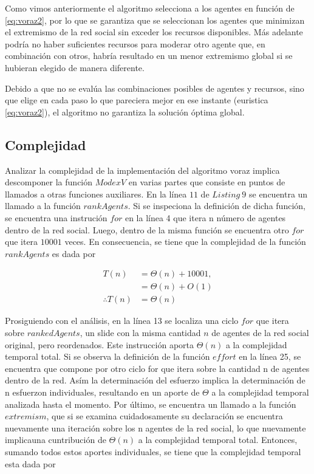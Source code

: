 \documentclass[letterpaper,10pt]{article}
\begin{document}
Como vimos anteriormente el algoritmo selecciona a los agentes en función de \eqref{eq:voraz2}, por lo que se garantiza que se seleccionan los agentes que minimizan el extremismo de la red social sin exceder los recursos disponibles. Más adelante podría no haber suficientes recursos para moderar otro agente que, en combinación con otros, habría resultado en un menor extremismo global si se hubieran elegido de manera diferente.

Debido a que no se evalúa las combinaciones posibles de agentes y recursos, sino que elige en cada paso lo que pareciera mejor en ese instante (euristica \eqref{eq:voraz2}), el algoritmo no garantiza la solución óptima global.

\subsection{Complejidad}
\label{subsec:complejidad_algoritmo_voraz}
Analizar la complejidad de la implementación del algoritmo voraz implica descomponer la función $ModexV$ en varias partes que consiste en puntos de llamados a otras funciones auxiliares. En la línea $11$ de $Listing~9$ se encuentra un llamado a la función $rankAgents$. Si se inspeciona la definición de dicha función, se encuentra una instrución $for$ en la línea 4 que itera n número de agentes dentro de la red social. Luego, dentro de la misma función se encuentra otro $for$ que itera $10001$ veces. En consecuencia, se tiene que la complejidad de la función $rankAgents$ es dada por

\begin{align*}
  T(n) &= \Theta(n) + 10001,\\
  &= \Theta(n) + O(1)\\
  \therefore T(n) &= \Theta(n)
\end{align*}

Prosiguiendo con el análisis, en la línea 13 se localiza una ciclo $for$ que itera sobre $rankedAgents$, un slide con la misma cantidad $n$ de agentes de la red social original, pero reordenados. Este instrucción aporta $\Theta(n)$ a la complejidad temporal total. Si se observa la definición de la función $effort$ en la línea 25, se encuentra que compone por otro ciclo for que itera sobre la cantidad n de agentes dentro de la red. Asím la determinación del esfuerzo implica la determinación de n esfuerzon individuales, resultando en un aporte de $\Theta$ a la complejidad temporal analizada hasta el momento. Por último, se encuentra un llamado a la función $extremism$, que si se examina cuidadosamente su declaración se encuentra nuevamente una iteración sobre los n agentes de la red social, lo que nuevamente implicauna cuntribución de $\Theta(n)$ a la complejidad temporal total.
Entonces, sumando todos estos aportes individuales, se tiene que la complejidad temporal esta dada por
\end{document}
